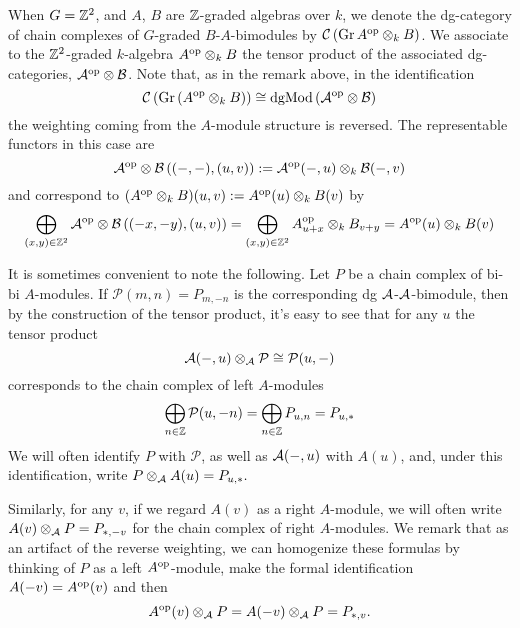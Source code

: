 When \(G = \mathbb{Z}^2\), and \(A\), \(B\) are \(\mathbb{Z}\)-graded algebras over \(k\), we denote the dg-category of chain complexes of \(G\)-graded \(B\)-\(A\)-bimodules by \(\mathcal{C}\left(\operatorname{Gr}A^{\operatorname{op}} \otimes_k B\right)\).
We associate to the \(\mathbb{Z}^2\)-graded \(k\)-algebra \(A^{\operatorname{op}} \otimes_k B\) the tensor product of the associated dg-categories, \(\mathcal{A}^{\operatorname{op}} \otimes \mathcal{B}\).
Note that, as in the remark above, in the identification
\[\mathcal{C}\left(\operatorname{Gr}\left(A^{\operatorname{op}} \otimes_k B\right)\right) \cong \operatorname{dgMod}\left(\mathcal{A}^{\operatorname{op}} \otimes \mathcal{B}\right)\]
the weighting coming from the \(A\)-module structure is reversed.
The representable functors in this case are
\[\mathcal{A}^{\operatorname{op}} \otimes \mathcal{B}\left((-,-), (u,v)\right) := \mathcal{A}^{\operatorname{op}}(-, u) \otimes_k \mathcal{B}(-,v)\]
and correspond to \((A^{\operatorname{op}} \otimes_k B)(u,v) := A^{\operatorname{op}}(u) \otimes_k B(v)\) by 
\[\bigoplus_{(x,y) \in \mathbb{Z}^2} \mathcal{A}^{\operatorname{op}} \otimes \mathcal{B}\left((-x,-y),(u,v)\right) = \bigoplus_{(x,y) \in \mathbb{Z}^2} A^{\operatorname{op}}_{u + x} \otimes_k B_{v + y} = A^{\operatorname{op}}(u) \otimes_k B(v)\]


\begin{remark}\label{remark: tensor with twist}
  It is sometimes convenient to note the following.
  Let \(P\) be a chain complex of bi-bi \(A\)-modules.
  If \(\mathcal{P}(m,n) = P_{m,-n}\) is the corresponding dg \(\mathcal{A}\)-\(\mathcal{A}\)-bimodule, then by the construction of the tensor product, it's easy to see that for any \(u\) the tensor product 
  \[\mathcal{A}(-, u) \otimes_{\mathcal{A}} \mathcal{P} \cong \mathcal{P}(u, -)\]
  corresponds to the chain complex of left \(A\)-modules
  \[\bigoplus_{n \in \mathbb{Z}} \mathcal{P}(u,-n) = \bigoplus_{n \in \mathbb{Z}} P_{u,n} = P_{u, \ast}\]
  We will often identify \(P\) with \(\mathcal{P}\), as well as \(\mathcal{A}(-, u)\) with \(A(u)\), and, under this identification, write \({P \otimes_{\mathcal{A}} A(u)= P_{u,\ast}}.\)

  Similarly, for any \(v\), if we regard \(A(v)\) as a right \(A\)-module, we will often write \({A(v) \otimes_{\mathcal{A}} P = P_{\ast,-v}}\) for the chain complex of right \(A\)-modules.
  We remark that as an artifact of the reverse weighting, we can homogenize these formulas by thinking of \(P\) as a left \(A^{\operatorname{op}}\)-module, make the formal identification \(A(-v) = A^{\operatorname{op}}(v)\) and then
  \[A^{\operatorname{op}}(v) \otimes_{\mathcal{A}} P = A(-v) \otimes_{\mathcal{A}} P = P_{\ast,v}.\]
\end{remark}
